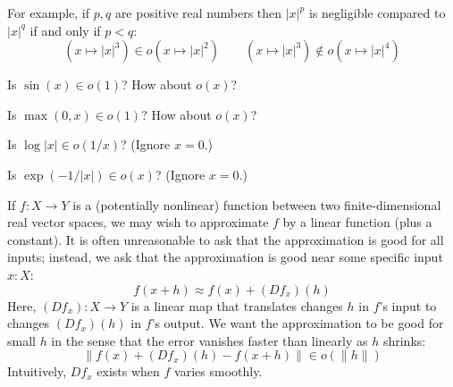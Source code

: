         For example, if $p,q$ are positive real numbers
        then $|x|^p$ is negligible compared
        to $|x|^q$ if and only if $p<q$:
        $$
            (x \mapsto |x|^3)     \in o(x \mapsto |x|^2)
            \quad\quad
            (x \mapsto |x|^3) \not\in o(x \mapsto |x|^4)
        $$

        \par\noindent
         {Is $\sin(x) \in o(1)$?  How about $o(x)$?}

        \par\noindent
         {Is $\max(0,x) \in o(1)$?  How about $o(x)$?}

        \par\noindent
         {Is $\log |x| \in o(1/x)$?  (Ignore $x=0$.)}

        \par\noindent
         {Is $\exp(-1/|x|) \in o(x)$?  (Ignore $x=0$.)}

        If $f:X\to Y$ is a (potentially nonlinear) function between two
        finite-dimensional real vector spaces, we may wish to approximate $f$
        by a linear function (plus a constant).  It is often unreasonable to
        ask that the approximation is good for all inputs; instead, we ask that
        the approximation is good near some specific input $x:X$:
        $$
            f(x+h) \approx f(x) + (Df_x)(h)
        $$
        Here, $(Df_x):X\to Y$ is a linear map that translates changes $h$ in
        $f$'s input to changes $(Df_x)(h)$ in $f$'s output.  We want the
        approximation to be good for small $h$ in the sense that the error
        vanishes faster than linearly as $h$ shrinks:
        $$
            \|f(x) + (Df_x)(h) - f(x+h)\| \in o(\|h\|)
        $$
        Intuitively, $Df_x$ exists when $f$ varies smoothly.

      \sampassage{}


